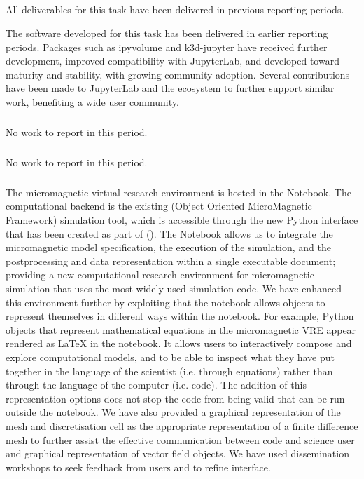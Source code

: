 \subparagraph{}
\label{UI@vis3d}

All deliverables for this task have been delivered in previous reporting periods.

The software developed for this task has been delivered in earlier reporting periods.
Packages such as ipyvolume and k3d-jupyter have received further development,
improved compatibility with JupyterLab,
and developed toward maturity and stability,
with growing community adoption.
Several contributions have been made to JupyterLab and
the \Jupyter ecosystem to further support similar work,
benefiting a wide user community.

\subparagraph{} %
\label{UI@cfd-vis}

No work to report in this period.


\subparagraph{} %

No work to report in this period.

\subparagraph{} %
\label{UI@oommf-py-ipython-attributes}


The micromagnetic virtual research environment is hosted in the
\Jupyter Notebook. The computational backend is the existing \OOMMF
(Object Oriented MicroMagnetic Framework) simulation tool, which is
accessible through the new Python interface that has been created as
part of \ODK
(). The
\Jupyter Notebook allows us to integrate the micromagnetic model
specification, the execution of the simulation, and the postprocessing
and data representation within a single executable document; providing
a new computational research environment for micromagnetic simulation
that uses the most widely used simulation code. We have enhanced this
environment further by exploiting that the notebook allows objects to
represent themselves in different ways within the notebook. For
example, Python objects that represent mathematical equations in the
micromagnetic VRE appear rendered as \LaTeX{} in the notebook. It
allows users to interactively compose and explore computational
models, and to be able to inspect what they have put together in the
language of the scientist (i.e. through equations) rather than through
the language of the computer (i.e. code). The addition of this
representation options does not stop the code from being valid \Python
that can be run outside the notebook. We have also provided a
graphical representation of the mesh and discretisation cell as the
appropriate representation of a finite difference mesh to further
assist the effective communication between code and science user and
graphical representation of vector field objects.  We have used
dissemination workshops to seek feedback from users and to refine
interface.

